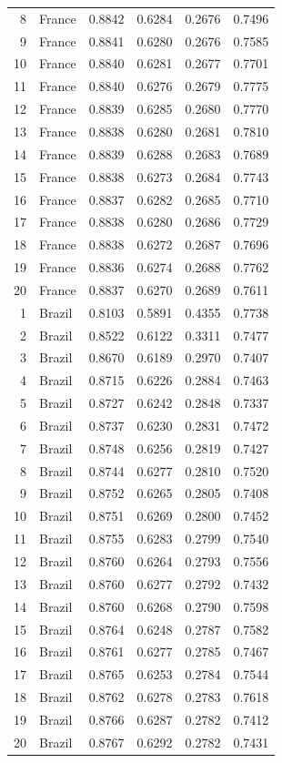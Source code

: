 \begin{tabular}{rlrrrr}
8 & France & 0.8842 & 0.6284 & 0.2676 & 0.7496 \\
9 & France & 0.8841 & 0.6280 & 0.2676 & 0.7585 \\
10 & France & 0.8840 & 0.6281 & 0.2677 & 0.7701 \\
11 & France & 0.8840 & 0.6276 & 0.2679 & 0.7775 \\
12 & France & 0.8839 & 0.6285 & 0.2680 & 0.7770 \\
13 & France & 0.8838 & 0.6280 & 0.2681 & 0.7810 \\
14 & France & 0.8839 & 0.6288 & 0.2683 & 0.7689 \\
15 & France & 0.8838 & 0.6273 & 0.2684 & 0.7743 \\
16 & France & 0.8837 & 0.6282 & 0.2685 & 0.7710 \\
17 & France & 0.8838 & 0.6280 & 0.2686 & 0.7729 \\
18 & France & 0.8838 & 0.6272 & 0.2687 & 0.7696 \\
19 & France & 0.8836 & 0.6274 & 0.2688 & 0.7762 \\
20 & France & 0.8837 & 0.6270 & 0.2689 & 0.7611 \\
1 & Brazil & 0.8103 & 0.5891 & 0.4355 & 0.7738 \\
2 & Brazil & 0.8522 & 0.6122 & 0.3311 & 0.7477 \\
3 & Brazil & 0.8670 & 0.6189 & 0.2970 & 0.7407 \\
4 & Brazil & 0.8715 & 0.6226 & 0.2884 & 0.7463 \\
5 & Brazil & 0.8727 & 0.6242 & 0.2848 & 0.7337 \\
6 & Brazil & 0.8737 & 0.6230 & 0.2831 & 0.7472 \\
7 & Brazil & 0.8748 & 0.6256 & 0.2819 & 0.7427 \\
8 & Brazil & 0.8744 & 0.6277 & 0.2810 & 0.7520 \\
9 & Brazil & 0.8752 & 0.6265 & 0.2805 & 0.7408 \\
10 & Brazil & 0.8751 & 0.6269 & 0.2800 & 0.7452 \\
11 & Brazil & 0.8755 & 0.6283 & 0.2799 & 0.7540 \\
12 & Brazil & 0.8760 & 0.6264 & 0.2793 & 0.7556 \\
13 & Brazil & 0.8760 & 0.6277 & 0.2792 & 0.7432 \\
14 & Brazil & 0.8760 & 0.6268 & 0.2790 & 0.7598 \\
15 & Brazil & 0.8764 & 0.6248 & 0.2787 & 0.7582 \\
16 & Brazil & 0.8761 & 0.6277 & 0.2785 & 0.7467 \\
17 & Brazil & 0.8765 & 0.6253 & 0.2784 & 0.7544 \\
18 & Brazil & 0.8762 & 0.6278 & 0.2783 & 0.7618 \\
19 & Brazil & 0.8766 & 0.6287 & 0.2782 & 0.7412 \\
20 & Brazil & 0.8767 & 0.6292 & 0.2782 & 0.7431 \\
\bottomrule
\end{tabular}
